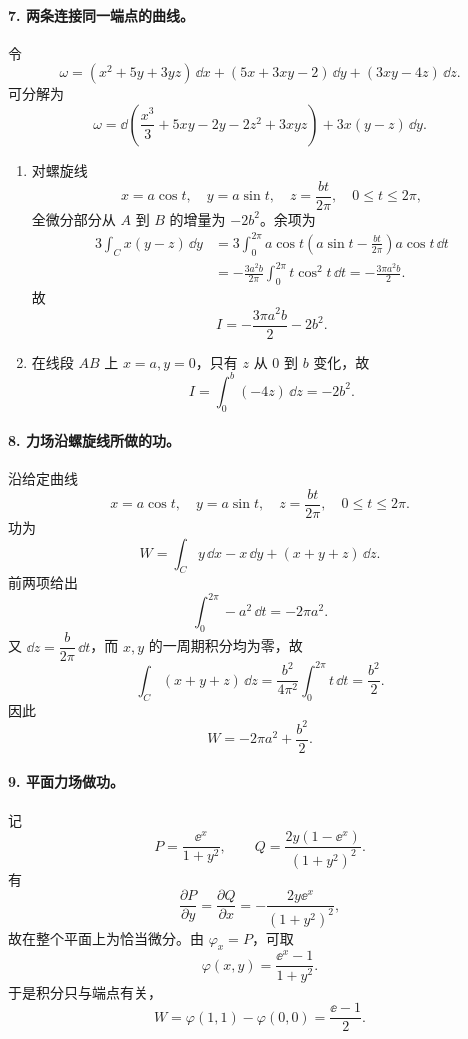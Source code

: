 \paragraph{7. 两条连接同一端点的曲线。}
\begin{xsolution}
令
\[
  \omega=(x^2+5y+3yz)\,\dd x+(5x+3xy-2)\,\dd y+(3xy-4z)\,\dd z.
\]
可分解为
\[
  \omega=\dd\left(\frac{x^3}{3}+5xy-2y-2z^2+3xyz\right)
  +3x(y-z)\,\dd y.
\]
\begin{enumerate}[label=(\arabic*)]
\item 对螺旋线
\[
  x=a\cos t,\quad y=a\sin t,\quad z=\frac{bt}{2\pi},\quad0\le t\le2\pi,
\]
全微分部分从 $A$ 到 $B$ 的增量为 $-2b^2$。余项为
\begin{align*}
  3\int_Cx(y-z)\,\dd y
  &=3\int_0^{2\pi}a\cos t
    \left(a\sin t-\frac{bt}{2\pi}\right)a\cos t\,\dd t\\
  &=-\frac{3a^2b}{2\pi}\int_0^{2\pi}t\cos^2t\,\dd t
   =-\frac{3\pi a^2b}{2}.
\end{align*}
故
\[
  I=-\frac{3\pi a^2b}{2}-2b^2.
\]

\item 在线段 $AB$ 上 $x=a,y=0$，只有 $z$ 从 $0$ 到 $b$ 变化，故
\[
  I=\int_0^b(-4z)\,\dd z=-2b^2.
\]
\end{enumerate}
\end{xsolution}

\paragraph{8. 力场沿螺旋线所做的功。}
\begin{xsolution}
沿给定曲线
\[
  x=a\cos t,\quad y=a\sin t,\quad z=\frac{bt}{2\pi},\quad0\le t\le2\pi.
\]
功为
\[
  W=\int_Cy\,\dd x-x\,\dd y+(x+y+z)\,\dd z.
\]
前两项给出
\[
  \int_0^{2\pi}-a^2\,\dd t=-2\pi a^2.
\]
又 $\dd z=\dfrac{b}{2\pi}\,\dd t$，而 $x,y$ 的一周期积分均为零，故
\[
  \int_C(x+y+z)\,\dd z
  =\frac{b^2}{4\pi^2}\int_0^{2\pi}t\,\dd t
  =\frac{b^2}{2}.
\]
因此
\[
  W=-2\pi a^2+\frac{b^2}{2}.
\]
\end{xsolution}

\paragraph{9. 平面力场做功。}
\begin{xsolution}
记
\[
  P=\frac{\ee^x}{1+y^2},
  \qquad
  Q=\frac{2y(1-\ee^x)}{(1+y^2)^2}.
\]
有
\[
  \frac{\partial P}{\partial y}
  =\frac{\partial Q}{\partial x}
  =-\frac{2y\ee^x}{(1+y^2)^2},
\]
故在整个平面上为恰当微分。由 $\varphi_x=P$，可取
\[
  \varphi(x,y)=\frac{\ee^x-1}{1+y^2}.
\]
于是积分只与端点有关，
\[
  W=\varphi(1,1)-\varphi(0,0)
   =\frac{\ee-1}{2}.
\]
\end{xsolution}

